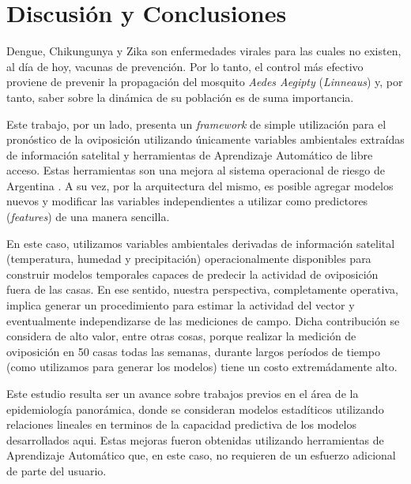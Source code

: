 



\justifying

\chapter{Discusión y Conclusiones}

  \par Dengue, Chikungunya y Zika son enfermedades virales para las cuales no
    existen, al día de hoy, vacunas de prevención. Por lo tanto, el control
    más efectivo proviene de prevenir la propagación del mosquito
    \textit{Aedes Aegipty} (\textit{Linneaus}) y, por tanto, saber sobre la
    dinámica de su población es de suma importancia.

  \par Este trabajo, por un lado, presenta un \textit{framework} de simple
    utilización para el
    pronóstico de la oviposición utilizando
    únicamente variables ambientales extraídas de información satelital y
    herramientas de Aprendizaje Automático de libre acceso. Estas herramientas
    son una mejora al sistema operacional de riesgo de
    Argentina \cite{porcasi_operative}. A su vez, por la arquitectura del mismo,
    es posible agregar modelos nuevos y modificar las variables independientes a utilizar como
    predictores (\textit{features}) de una manera sencilla.

  \par En este caso, utilizamos variables ambientales derivadas de información satelital
    (temperatura, humedad y precipitación) operacionalmente disponibles para
    construir modelos temporales capaces de predecir la actividad de oviposición
    fuera de las casas. En ese sentido, nuestra perspectiva, completamente operativa,
    implica generar un procedimiento para estimar la actividad del vector
    y eventualmente independizarse de las mediciones de campo. Dicha contribución
    se considera de alto valor, entre otras cosas, porque realizar la medición
    de oviposición en 50 casas todas las semanas, durante
    largos períodos de tiempo (como utilizamos para generar los modelos) tiene
    un costo extremádamente alto.

  \par Este estudio resulta ser un avance sobre trabajos previos en el área
    de la epidemiología panorámica, donde se consideran modelos estadíticos utilizando
    relaciones lineales \cite{models_predicting, modis_data, ndwi_erffectiveness}
    en terminos de la capacidad predictiva de los modelos desarrollados aqui.
    Estas mejoras fueron obtenidas utilizando herramientas de Aprendizaje
    Automático que, en este caso, no requieren de un esfuerzo adicional de
    parte del usuario.

